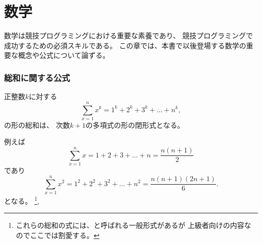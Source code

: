 \begin{comment}
\section{Mathematics}

Mathematics plays an important role in competitive
programming, and it is not possible to become
a successful competitive programmer without
having good mathematical skills.
This section discusses some important
mathematical concepts and formulas that
are needed later in the book.
\end{comment}

\section{数学}

数学は競技プログラミングにおける重要な素養であり、
競技プログラミングで成功するための必須スキルである。
この章では、本書で以後登場する数学の重要な概念や公式について論ずる。

\begin{comment}
\subsubsection{Sum formulas}

Each sum of the form
\[\sum_{x=1}^n x^k = 1^k+2^k+3^k+\ldots+n^k,\]
where $k$ is a positive integer,
has a closed-form formula that is a
polynomial of degree $k+1$.
For example\footnote{\index{Faulhaber's formula}
There is even a general formula for such sums, called \key{Faulhaber's formula},
but it is too complex to be presented here.},
\[\sum_{x=1}^n x = 1+2+3+\ldots+n = \frac{n(n+1)}{2}\]
and
\[\sum_{x=1}^n x^2 = 1^2+2^2+3^2+\ldots+n^2 = \frac{n(n+1)(2n+1)}{6}.\]
\end{comment}

\subsubsection{総和に関する公式}

正整数$k$に対する \[\sum_{x=1}^n x^k = 1^k+2^k+3^k+\ldots+n^k,\] の形の総和は、
次数$k+1$の多項式の形の閉形式となる。

例えば
\[\sum_{x=1}^n x = 1+2+3+\ldots+n = \frac{n(n+1)}{2}\]
であり
\[\sum_{x=1}^n x^2 = 1^2+2^2+3^2+\ldots+n^2 = \frac{n(n+1)(2n+1)}{6}.\]
となる。
\footnote{
これらの総和の式には、と呼ばれる一般形式があるが
上級者向けの内容なのでここでは割愛する。},

